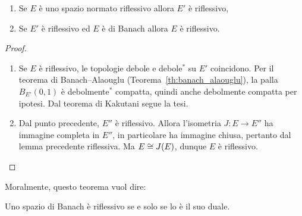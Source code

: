 \begin{theorem}
	\leavevmode
	\begin{enumerate}
		\item Se $E$ è uno spazio normato riflessivo allora $E'$ è riflessivo,
		\item Se $E'$ è riflessivo ed $E$ è di Banach allora $E$ è riflessivo.
	\end{enumerate}
\end{theorem}
\begin{proof}
	\leavevmode
	\begin{enumerate}
		\item Se $E$ è riflessivo, le topologie debole e debole$^*$ su $E'$ coincidono. Per il teorema di Banach--Alaouglu (Teorema~\ref{th:banach_alaouglu}), la palla $B_{E'}(0,1)$ è debolmente$^*$ compatta, quindi anche debolmente compatta per ipotesi. Dal teorema di Kakutani segue la tesi.

		\item Dal punto precedente, $E''$ è riflessivo. Allora l'isometria $J:E \to E''$ ha immagine completa in $E''$, in particolare ha immagine chiusa, pertanto dal lemma precedente riflessiva. Ma $E \overset{}{\cong} J(E)$, dunque $E$ è riflessivo.
	\end{enumerate}
\end{proof}

Moralmente, questo teorema vuol dire:

\begin{corollary}
	Uno spazio di Banach è riflessivo se e solo se lo è il suo duale.
\end{corollary}
